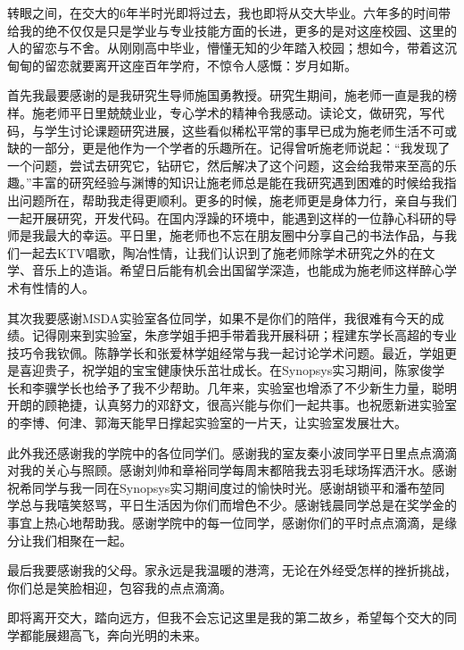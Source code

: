 \begin{thanks}

\ifsjtu@review\relax\else

转眼之间，在交大的6年半时光即将过去，我也即将从交大毕业。六年多的时间带给我的绝不仅仅是只是学业与专业技能方面的长进，更多的是对这座校园、这里的人的留恋与不舍。从刚刚高中毕业，懵懂无知的少年踏入校园；想如今，带着这沉甸甸的留恋就要离开这座百年学府，不惊令人感慨：岁月如斯。

首先我最要感谢的是我研究生导师施国勇教授。研究生期间，施老师一直是我的榜样。施老师平日里兢兢业业，专心学术的精神令我感动。读论文，做研究，写代码，与学生讨论课题研究进展，这些看似稀松平常的事早已成为施老师生活不可或缺的一部分，更是他作为一个学者的乐趣所在。记得曾听施老师说起：“我发现了一个问题，尝试去研究它，钻研它，然后解决了这个问题，这会给我带来至高的乐趣。”丰富的研究经验与渊博的知识让施老师总是能在我研究遇到困难的时候给我指出问题所在，帮助我走得更顺利。更多的时候，施老师更是身体力行，亲自与我们一起开展研究，开发代码。在国内浮躁的环境中，能遇到这样的一位静心科研的导师是我最大的幸运。平日里，施老师也不忘在朋友圈中分享自己的书法作品，与我们一起去KTV唱歌，陶冶性情，让我们认识到了施老师除学术研究之外的在文学、音乐上的造诣。希望日后能有机会出国留学深造，也能成为施老师这样醉心学术有性情的人。

其次我要感谢MSDA实验室各位同学，如果不是你们的陪伴，我很难有今天的成绩。记得刚来到实验室，朱彦学姐手把手带着我开展科研；程建东学长高超的专业技巧令我钦佩。陈静学长和张爱林学姐经常与我一起讨论学术问题。最近，学姐更是喜迎贵子，祝学姐的宝宝健康快乐茁壮成长。在Synopsys实习期间，陈家俊学长和李骥学长也给予了我不少帮助。几年来，实验室也增添了不少新生力量，聪明开朗的顾艳捷，认真努力的邓舒文，很高兴能与你们一起共事。也祝愿新进实验室的李博、何津、郭海天能早日撑起实验室的一片天，让实验室发展壮大。

此外我还感谢我的学院中的各位同学们。感谢我的室友秦小波同学平日里点点滴滴对我的关心与照顾。感谢刘帅和章裕同学每周末都陪我去羽毛球场挥洒汗水。感谢祝希同学与我一同在Synopsys实习期间度过的愉快时光。感谢胡锁平和潘布堃同学总与我嘻笑怒骂，平日生活因为你们而增色不少。感谢钱晨同学总是在奖学金的事宜上热心地帮助我。感谢学院中的每一位同学，感谢你们的平时点点滴滴，是缘分让我们相聚在一起。

最后我要感谢我的父母。家永远是我温暖的港湾，无论在外经受怎样的挫折挑战，你们总是笑脸相迎，包容我的点点滴滴。

即将离开交大，踏向远方，但我不会忘记这里是我的第二故乡，希望每个交大的同学都能展翅高飞，奔向光明的未来。

\fi

\end{thanks}
